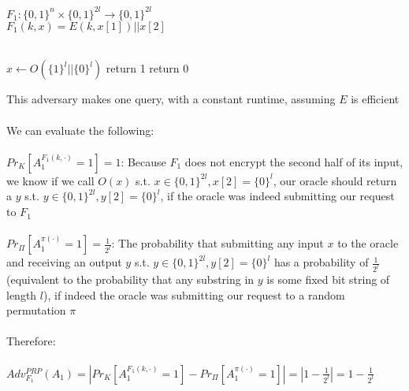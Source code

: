 \documentclass[]{article}
\begin{document}
\subsection{}
$F_1: \{0,1\}^n \times \{0,1\}^{2l} \rightarrow \{0,1\}^{2l}$
\\
$F_1(k, x) = E(k, x[1]) || x[2]$
\\\\
\begin{algorithm}[H]
	\SetAlgoLined
	$x \leftarrow O(\{1\}^l || \{0\}^l)$\;
	 {
		return 1
	}
	return 0
	\caption{$A_1$}
\end{algorithm}
This adversary makes one query, with a constant runtime, assuming $E$ is efficient
\\\\
We can evaluate the following:
\\\\
$Pr_K[A_1^{F_1(k, \cdot)} = 1] = 1$: Because $F_1$ does not encrypt the second half of its input, we know if we call $O(x)$ s.t. $x \in \{0,1\}^{2l}, x[2] = \{0\}^l$, our oracle should return a $y$ s.t. $y \in \{0,1\}^{2l}, y[2] = \{0\}^l$, if the oracle was indeed submitting our request to $F_1$
\\\\
$Pr_\Pi[A_1^{\pi(\cdot)} = 1] = \frac{1}{2^l}$: The probability that submitting any input $x$ to the oracle and receiving an output $y$ s.t. $y \in \{0,1\}^{2l}, y[2] = \{0\}^l$ has a probability of $\frac{1}{2^l}$ (equivalent to the probability that any substring in $y$ is some fixed bit string of length $l$), if indeed the oracle was submitting our request to a random permutation $\pi$
\\\\
Therefore:
\\\\
$Adv_{F_1}^{PRP}(A_1) = |Pr_K[A_1^{F_1(k, \cdot)} = 1] - Pr_\Pi[A_1^{\pi(\cdot)} = 1]| = |1 - \frac{1}{2^l}| = 1 - \frac{1}{2^l}$
\end{document}
